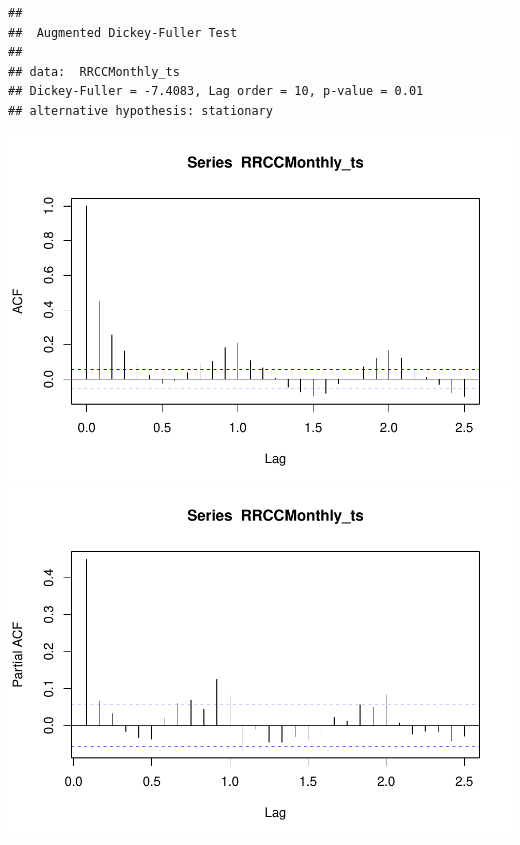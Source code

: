 \documentclass[12pt,]{article}
\begin{document}
\begin{verbatim}
## 
##  Augmented Dickey-Fuller Test
## 
## data:  RRCCMonthly_ts
## Dickey-Fuller = -7.4083, Lag order = 10, p-value = 0.01
## alternative hypothesis: stationary
\end{verbatim}

\includegraphics{Project_Template_files/figure-latex/unnamed-chunk-6-23.pdf}
\includegraphics{Project_Template_files/figure-latex/unnamed-chunk-6-24.pdf}
\end{document}
